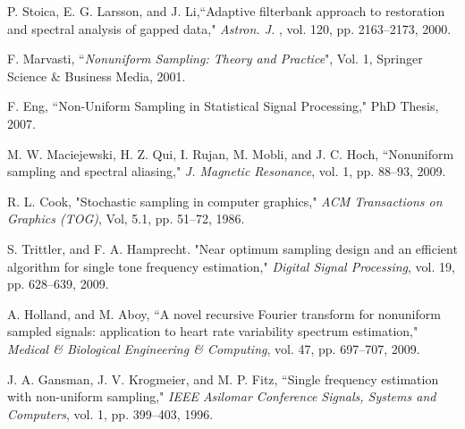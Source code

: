 \documentclass{UCF_ETD}
\begin{document}
\begin{thebibliography}{99}
P. Stoica, E. G. Larsson, and J. Li,``Adaptive filterbank approach to restoration and spectral analysis of gapped data," \emph{Astron. J.} , vol. 120, pp. 2163--2173,  2000.


F. Marvasti, ``\emph{Nonuniform Sampling: Theory and Practice}", Vol. 1, Springer Science \& Business Media, 2001.

F. Eng,  ``Non-Uniform Sampling in Statistical Signal Processing," PhD Thesis, 2007.

M. W. Maciejewski, H. Z. Qui, I. Rujan, M. Mobli, and J. C. Hoch, ``Nonuniform sampling and spectral aliasing,"  \emph{J. Magnetic Resonance}, vol. 1, pp. 88--93, 2009.



R. L. Cook,  "Stochastic sampling in computer graphics,"  \emph{ACM Transactions on Graphics (TOG)},
Vol, 5.1, pp. 51--72,  1986.

S. Trittler,  and F. A. Hamprecht. "Near optimum sampling design and an efficient algorithm for single tone frequency estimation,"
{\em Digital Signal Processing}, vol. 19, pp. 628--639, 2009.

A. Holland, and M. Aboy, ``A novel recursive Fourier transform for nonuniform sampled signals: application to heart rate variability spectrum estimation," \emph{Medical \& Biological Engineering \& Computing}, vol. 47, pp. 697--707, 2009.





J. A. Gansman, J. V. Krogmeier, and M. P. Fitz, ``Single frequency estimation with non-uniform sampling," \emph{IEEE Asilomar Conference Signals, Systems and Computers}, vol. 1, pp. 399--403, 1996.



\end{thebibliography}
\end{document}

